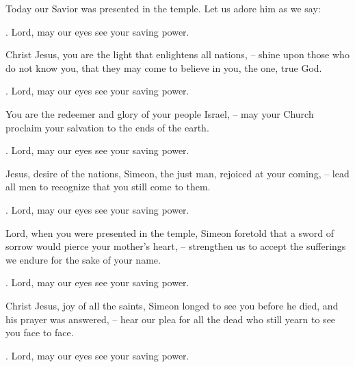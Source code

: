 \lettrine[loversize=0.15,lines=2]{T}{}oday our Savior was presented in the temple. Let us adore him as we say:
\par \Rbar. Lord, may our eyes see your saving power.

Christ Jesus, you are the light that enlightens all nations,
– shine upon those who do not know you, that they may come to believe in you, the one, true God.
\par \Rbar. Lord, may our eyes see your saving power.

You are the redeemer and glory of your people Israel,
– may your Church proclaim your salvation to the ends of the earth.
\par \Rbar. Lord, may our eyes see your saving power.

Jesus, desire of the nations, Simeon, the just man, rejoiced at your coming,
– lead all men to recognize that you still come to them.
\par \Rbar. Lord, may our eyes see your saving power.

Lord, when you were presented in the temple, Simeon foretold that a sword of sorrow would pierce your mother’s heart,
– strengthen us to accept the sufferings we endure for the sake of your name.
\par \Rbar. Lord, may our eyes see your saving power.

Christ Jesus, joy of all the saints, Simeon longed to see you before he died, and his prayer was answered,
– hear our plea for all the dead who still yearn to see you face to face.
\par \Rbar. Lord, may our eyes see your saving power.